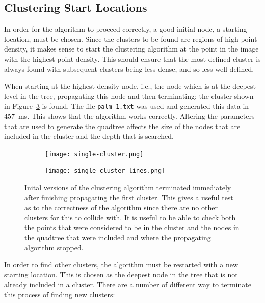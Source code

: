 \subsection{Clustering Start Locations}
\label{sub:clustering_start_locations}

In order for the algorithm to proceed correctly, a good initial node, a
starting location, must be chosen. Since the clusters to be found are regions
of high point density, it makes sense to start the clustering algorithm at the
point in the image with the highest point density. This should ensure that the
most defined cluster is always found with subsequent clusters being less dense,
and so less well defined.

When starting at the highest density node, i.e., the node which is at the
deepest level in the tree, propagating this node and then terminating; the
cluster shown in Figure~\ref{fig:single-cluster} is found. The file
\texttt{palm-1.txt} was used and generated this data in
\SI{457}{\milli\second}. This shows that the algorithm works correctly.
Altering the parameters that are used to generate the quadtree affects the size
of the nodes that are included in the cluster and the depth that is searched.

\begin{figure}[tbhp]
	\centering
	\begin{subfigure}[c]{4.2cm}
		\texttt{[image: single-cluster.png]}
		\caption{}\label{fig:single-cluster-points}
	\end{subfigure}%
	\quad
	\begin{subfigure}[c]{4.2cm}
		\texttt{[image: single-cluster-lines.png]}
		\caption{}\label{fig:single-cluster-lines}
	\end{subfigure}

	\caption[Propagation of a single starting location.]{Inital versions of the
		clustering algorithm terminated immediately after finishing propagating
		the first cluster. This gives a useful test as to the correctness of
		the algorithm since there are no other clusters for this to collide
		with. It is useful to be able to check both
		 the points that were considered to
		be in the cluster and  the nodes in
		the quadtree that were included and where the propagating algorithm
		stopped.}\label{fig:single-cluster}
\end{figure}

In order to find other clusters, the algorithm must be restarted with a new
starting location. This is chosen as the deepest node in the tree that is not
already included in a cluster. There are a number of different way to terminate
this process of finding new clusters:

